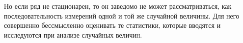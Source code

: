 Но если ряд не стационарен, то он заведомо не может
рассматриваться, как последовательность измерений одной и той же
случайной величины. Для него совершенно бессмысленно оценивать те
статистики, которые вводятся и исследуются при анализе случайных величин.

\printbibliography[heading=subbibliography, title={Источники}]